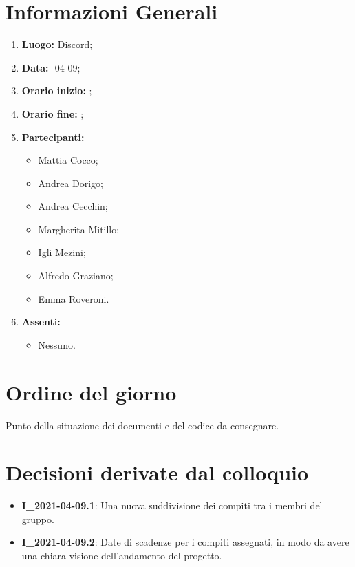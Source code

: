 \newpage
\section{Informazioni Generali}
\begin{enumerate}
	\item \textbf{Luogo:} \normalfont  Discord;
	\item \textbf{Data:} -04-09;
	\item \textbf{Orario inizio:} ;
	\item \textbf{Orario fine:} ;
	\item \textbf{Partecipanti:}
	\begin{itemize}
		\item Mattia Cocco;
		\item Andrea Dorigo;
		\item Andrea Cecchin;
		\item Margherita Mitillo;
		\item Igli Mezini;
		\item Alfredo Graziano;
		\item Emma Roveroni.
	\end{itemize}
	\item \textbf{Assenti:}
	\begin{itemize}
		\item Nessuno.
	\end{itemize}
\end{enumerate}
\section{Ordine del giorno}
Punto della situazione dei documenti e del codice da consegnare.

\section{Decisioni derivate dal colloquio}
\begin{itemize}
	\item \textbf{I\_2021-04-09.1}: Una nuova suddivisione dei compiti tra i membri del gruppo.
\end{itemize}
\begin{itemize}
	\item \textbf{I\_2021-04-09.2}: Date di scadenze per i compiti assegnati, in modo da avere una chiara visione dell'andamento del progetto.
\end{itemize}
